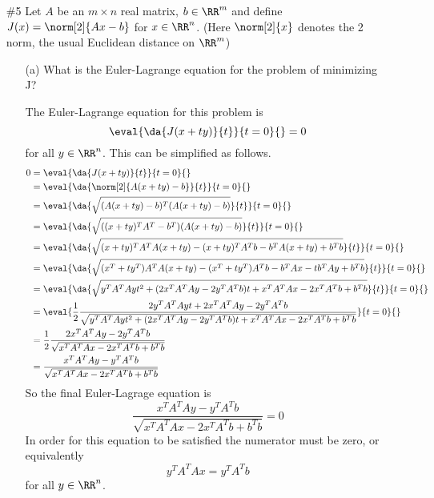 \documentclass[11pt, oneside]{article}
\begin{document}
\begin{enumerate}
  \pagebreak
  \item[\#5]
    Let $A$ be an $m \times n$ real matrix, $b \in \RR^m$ and define
    $J(x) = \norm[2]{Ax - b}$ for $x \in \RR^n$.
    (Here $\norm[2]{x}$ denotes the 2 norm, the usual Euclidean distance on
    $\RR^m$)
    \begin{enumerate}
      \item[(a)]
        What is the Euler-Lagrange equation for the problem of minimizing J?

        The Euler-Lagrange equation for this problem is
        \[
          \eval{\da{J(x + ty)}{t}}{t = 0}{} = 0
        \]
        for all $y \in \RR^n$.
        This can be simplified as follows.
        \begin{align*}
          0 &= \eval{\da{J(x + ty)}{t}}{t = 0}{} \\
          &= \eval{\da{\norm[2]{A(x + ty) - b}}{t}}{t = 0}{} \\
          &= \eval{\da{\sqrt{(A(x + ty) - b)^T (A(x + ty) - b)}}{t}}{t = 0}{} \\
          &= \eval{\da{\sqrt{((x + ty)^TA^T - b^T) (A(x + ty) - b)}}{t}}{t = 0}{} \\
          &= \eval{\da{\sqrt{(x + ty)^TA^T A(x + ty) - (x + ty)^TA^T b - b^T A(x + ty) + b^Tb}}{t}}{t = 0}{} \\
          &= \eval{\da{\sqrt{(x^T + ty^T) A^T A(x + ty) - (x^T + ty^T) A^T b - b^T A x - t b^T A y + b^Tb}}{t}}{t = 0}{} \\
          &= \eval{\da{\sqrt{y^T A^T A y t^2 + (2x^T A^T A y - 2y^T A^T b) t + x^T A^T A x - 2x^T A^T b + b^Tb}}{t}}{t = 0}{} \\
          &= \eval{\frac{1}{2}\frac{2 y^T A^T A y t + 2x^T A^T A y - 2y^T A^T b}{\sqrt{y^T A^T A y t^2 + (2x^T A^T A y - 2y^T A^T b) t + x^T A^T A x - 2x^T A^T b + b^Tb}}}{t = 0}{} \\
          &= \frac{1}{2}\frac{2x^T A^T A y - 2y^T A^T b}{\sqrt{x^T A^T A x - 2x^T A^T b + b^Tb}} \\
          &= \frac{x^T A^T A y - y^T A^T b}{\sqrt{x^T A^T A x - 2x^T A^T b + b^Tb}} \\
        \end{align*}
        So the final Euler-Lagrage equation is
        \[
          \frac{x^T A^T A y - y^T A^T b}{\sqrt{x^T A^T A x - 2x^T A^T b + b^Tb}} = 0
        \]
        In order for this equation to be satisfied the numerator must be zero,
        or equivalently
        \[
          y^T A^T A x = y^T A^T b
        \]
        for all $y \in \RR^n$.


\end{enumerate}
\end{enumerate}
\end{document}
